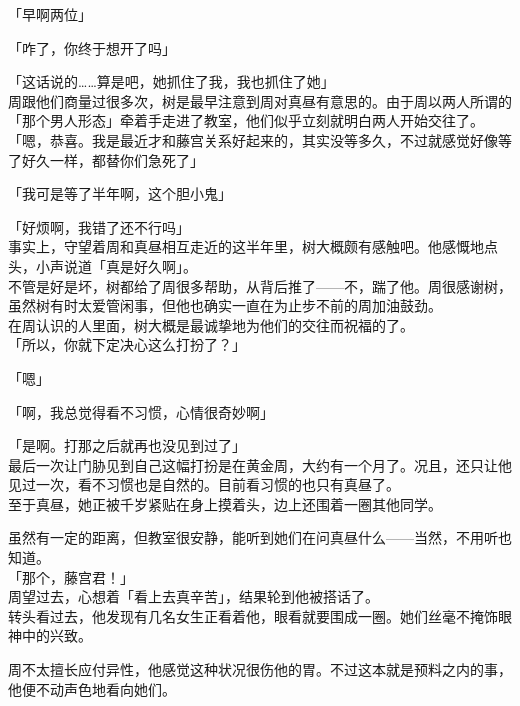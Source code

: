 「早啊两位」

「咋了，你终于想开了吗」

「这话说的……算是吧，她抓住了我，我也抓住了她」\\

周跟他们商量过很多次，树是最早注意到周对真昼有意思的。由于周以两人所谓的「那个男人形态」牵着手走进了教室，他们似乎立刻就明白两人开始交往了。\\

「嗯，恭喜。我是最近才和藤宫关系好起来的，其实没等多久，不过就感觉好像等了好久一样，都替你们急死了」

「我可是等了半年啊，这个胆小鬼」

「好烦啊，我错了还不行吗」\\

事实上，守望着周和真昼相互走近的这半年里，树大概颇有感触吧。他感慨地点头，小声说道「真是好久啊」。\\

不管是好是坏，树都给了周很多帮助，从背后推了——不，踹了他。周很感谢树，虽然树有时太爱管闲事，但他也确实一直在为止步不前的周加油鼓劲。\\

在周认识的人里面，树大概是最诚挚地为他们的交往而祝福的了。\\

「所以，你就下定决心这么打扮了？」

「嗯」

「啊，我总觉得看不习惯，心情很奇妙啊」

「是啊。打那之后就再也没见到过了」\\

最后一次让门胁见到自己这幅打扮是在黄金周，大约有一个月了。况且，还只让他见过一次，看不习惯也是自然的。目前看习惯的也只有真昼了。\\

至于真昼，她正被千岁紧贴在身上摸着头，边上还围着一圈其他同学。

虽然有一定的距离，但教室很安静，能听到她们在问真昼什么——当然，不用听也知道。\\

「那个，藤宫君！」\\

周望过去，心想着「看上去真辛苦」，结果轮到他被搭话了。\\

转头看过去，他发现有几名女生正看着他，眼看就要围成一圈。她们丝毫不掩饰眼神中的兴致。

周不太擅长应付异性，他感觉这种状况很伤他的胃。不过这本就是预料之内的事，他便不动声色地看向她们。\\

